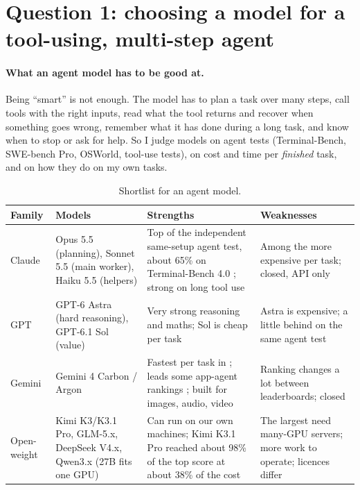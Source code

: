 \section{Question 1: choosing a model for a tool-using, multi-step agent}

\paragraph{What an agent model has to be good at.} Being ``smart'' is not enough. The model has to plan a task over many
steps, call tools with the right inputs, read what the tool returns and recover when something goes wrong, remember what
it has done during a long task, and know when to stop or ask for help. So I judge models on agent tests (Terminal-Bench,
SWE-bench Pro, OSWorld, tool-use tests), on cost and time per \emph{finished} task, and on how they do on my own tasks.

\begin{table}[H]
\centering
\small
\caption{Shortlist for an agent model.}
\label{tab:shortlist}
\begin{tabularx}{\linewidth}{@{}P{2.2cm}P{3.6cm}LL@{}}
\toprule
\textbf{Family} & \textbf{Models} & \textbf{Strengths} & \textbf{Weaknesses} \\
\midrule
Claude & Opus 5.5 (planning), Sonnet 5.5 (main worker), Haiku 5.5 (helpers) &
  Top of the independent same-setup agent test, about 65\% on Terminal-Bench 4.0 \citep{valstb4}; strong on long tool use &
  Among the more expensive per task; closed, API only \\
GPT & GPT-6 Astra (hard reasoning), GPT-6.1 Sol (value) &
  Very strong reasoning and maths; Sol is cheap per task \citep{geotoolbox2026,aitoolsreview2026} &
  Astra is expensive; a little behind on the same agent test \citep{valstb4} \\
Gemini & Gemini 4 Carbon / Argon &
  Fastest per task in \citep{valstb4}; leads some app-agent rankings \citep{geotoolbox2026}; built for images, audio, video &
  Ranking changes a lot between leaderboards; closed \\
Open-weight & Kimi K3/K3.1 Pro, GLM-5.x, DeepSeek V4.x, Qwen3.x (27B fits one GPU) &
  Can run on our own machines; Kimi K3.1 Pro reached about 98\% of the top score at about 38\% of the cost
  \citep{valstb4,morphopen2026} &
  The largest need many-GPU servers; more work to operate; licences differ \\
\bottomrule
\end{tabularx}
\end{table}


